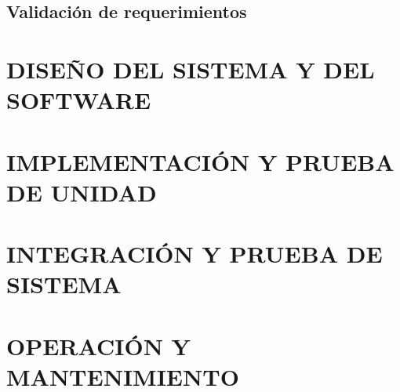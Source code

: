 	\subsection{Validación de requerimientos}
	

	

\section{DISEÑO DEL SISTEMA Y DEL SOFTWARE}
\section{IMPLEMENTACIÓN Y PRUEBA DE UNIDAD}
\section{INTEGRACIÓN Y PRUEBA DE SISTEMA}
\section{OPERACIÓN Y MANTENIMIENTO}
